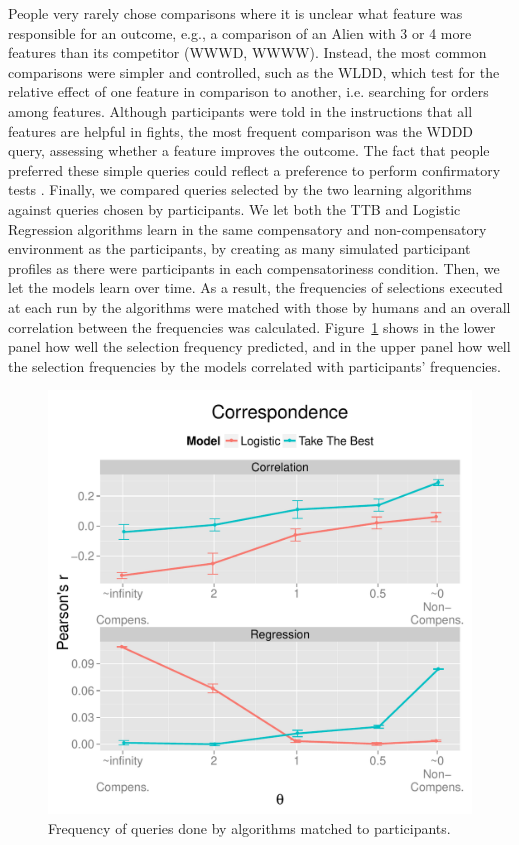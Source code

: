 \documentclass[10pt,letterpaper]{article}
\begin{document}
People very rarely chose comparisons where it is unclear what feature was responsible for an outcome, e.g., a  comparison of an Alien with 3 or 4 more features than its competitor (WWWD, WWWW). Instead, the most common comparisons were simpler and controlled, such as the WLDD, which test for the relative effect of one feature in comparison to another, i.e. searching for orders among features. Although participants were told in the instructions that all features are helpful in fights, the most frequent comparison was the WDDD query, assessing whether a feature improves the outcome. The fact that people preferred these simple queries could reflect a preference to perform confirmatory tests \citep{markant2012one}. Finally, we compared queries selected by the two learning algorithms against queries chosen by participants. We let both the TTB and Logistic Regression algorithms learn in the same compensatory and non-compensatory environment as the participants, by creating as many simulated participant profiles as there were participants in each compensatoriness condition. Then, we let the models learn over time. As a result, the frequencies of selections executed at each run by the algorithms were matched with those by humans and an overall correlation between the frequencies was calculated. Figure~\ref{result} shows in the lower panel how well the selection frequency predicted, and in the upper panel how well the selection frequencies by the models correlated with participants' frequencies.
\begin{figure}[htb!]
	\centering
\caption{Frequency of queries done by algorithms matched to participants.}
	\label{result}
	\includegraphics[scale=0.5]{results.pdf}
	
\end{figure}
\end{document}
